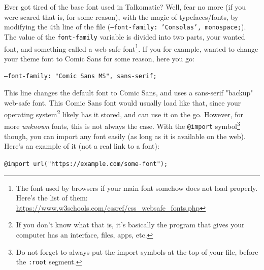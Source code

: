 \documentclass{article}
\begin{document}
Ever got tired of the base font used in Talkomatic? Well, fear no more (if you were scared that is, for some reason), with the magic of typefaces/fonts, by modifying the 4th line of the file (\texttt{--font-family: 'Consolas', monospace;}). The value of the \texttt{font-family} variable is divided into two parts, your wanted font, and something called a web-safe font\footnote{The font used by browsers if your main font somehow does not load properly. Here's the list of them: \url{https://www.w3schools.com/cssref/css_websafe_fonts.php}}. If you for example, wanted to change your theme font to Comic Sans for some reason, here you go:
\begin{tcolorbox}[colback=green!5!white,colframe=green!75!black,title=Custom font example]
  \texttt{--font-family: "Comic Sans MS", sans-serif;}
\end{tcolorbox}
This line changes the default font to Comic Sans, and uses a sans-serif "backup" web-safe font. This Comic Sans font would usually load like that, since your operating system\footnote{If you don't know what that is, it's basically the program that gives your computer has an interface, files, apps, etc.} likely has it stored, and can use it on the go. However, for more \textit{unknown} fonts, this is not always the case. With the \texttt{@import} symbol\footnote{Do not forget to always put the import symbols at the top of your file, before the \texttt{:root} segment.} though, you can import any font easily (as long as it is available on the web). Here's an example of it (not a real link to a font):
\begin{tcolorbox}[colback=green!5!white,colframe=green!75!black,title=@import at-rule example]
  \texttt{@import url("https://example.com/some-font");}
\end{tcolorbox}
\end{document}
